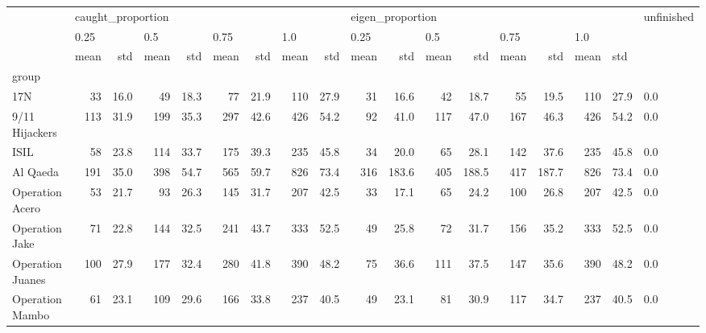 \begin{tabular}{lrrrrrrrrrrrrrrrrl}
\toprule
{} & \multicolumn{8}{l}{caught\_proportion} & \multicolumn{8}{l}{eigen\_proportion} & unfinished \\
{} & \multicolumn{2}{l}{0.25} & \multicolumn{2}{l}{0.5} & \multicolumn{2}{l}{0.75} & \multicolumn{2}{l}{1.0} & \multicolumn{2}{l}{0.25} & \multicolumn{2}{l}{0.5} & \multicolumn{2}{l}{0.75} & \multicolumn{3}{l}{1.0} \\
{} &              mean &   std & mean &   std & mean &   std & mean &   std &             mean &    std & mean &    std & mean &    std & mean & \multicolumn{2}{l}{std} \\
group                &                   &       &      &       &      &       &      &       &                  &        &      &        &      &        &      &       &            \\
\midrule
17N                  &                33 &  16.0 &   49 &  18.3 &   77 &  21.9 &  110 &  27.9 &               31 &   16.6 &   42 &   18.7 &   55 &   19.5 &  110 &  27.9 &        0.0 \\
9/11 Hijackers       &               113 &  31.9 &  199 &  35.3 &  297 &  42.6 &  426 &  54.2 &               92 &   41.0 &  117 &   47.0 &  167 &   46.3 &  426 &  54.2 &        0.0 \\
ISIL                 &                58 &  23.8 &  114 &  33.7 &  175 &  39.3 &  235 &  45.8 &               34 &   20.0 &   65 &   28.1 &  142 &   37.6 &  235 &  45.8 &        0.0 \\
Al Qaeda             &               191 &  35.0 &  398 &  54.7 &  565 &  59.7 &  826 &  73.4 &              316 &  183.6 &  405 &  188.5 &  417 &  187.7 &  826 &  73.4 &        0.0 \\
Operation Acero      &                53 &  21.7 &   93 &  26.3 &  145 &  31.7 &  207 &  42.5 &               33 &   17.1 &   65 &   24.2 &  100 &   26.8 &  207 &  42.5 &        0.0 \\
Operation Jake       &                71 &  22.8 &  144 &  32.5 &  241 &  43.7 &  333 &  52.5 &               49 &   25.8 &   72 &   31.7 &  156 &   35.2 &  333 &  52.5 &        0.0 \\
Operation Juanes     &               100 &  27.9 &  177 &  32.4 &  280 &  41.8 &  390 &  48.2 &               75 &   36.6 &  111 &   37.5 &  147 &   35.6 &  390 &  48.2 &        0.0 \\
Operation Mambo      &                61 &  23.1 &  109 &  29.6 &  166 &  33.8 &  237 &  40.5 &               49 &   23.1 &   81 &   30.9 &  117 &   34.7 &  237 &  40.5 &        0.0 \\

\end{tabular}

